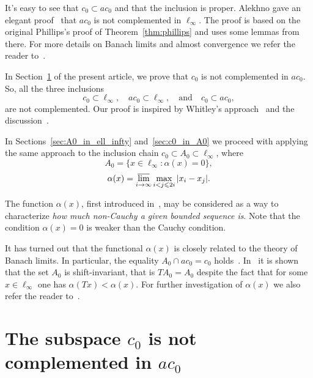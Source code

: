 \documentclass[a4paper,10pt]{article} %
\theoremstyle{plain}
\theoremstyle{definition}
\begin{document}
It's easy to see that $c_0 \subset ac_0$ and that the inclusion is proper.
Alekhno gave an elegant proof~\cite[Theorem 8]{alekhno2006propertiesII}
that $ac_0$ is not complemented in $\ell_\infty$.
The proof is based on the original Phillips's proof of Theorem~\ref{thm:phillips}
and uses some lemmas from there.
For more details on Banach limits and almost convergence we refer the reader to~\cite{sucheston1967banach,Eberlein,semenov2020geomBL}.

In Section~\ref{sec:c0_in_ac0} of the present article, we prove that $c_0$ is not complemented in $ac_0$.
So, all the three inclusions
\begin{equation}
	c_0 \subset \ell_\infty,
	\quad
	ac_0 \subset \ell_\infty,
	\quad\mbox{and}\quad
	c_0 \subset ac_0,
\end{equation}
are not complemented.
Our proof is inspired by Whitley's approach~\cite{whitley1968projecting}
and the discussion~\cite{mathSE_Phillips}.

In Sections~\ref{sec:A0_in_ell_infty} and~\ref{sec:c0_in_A0}
we proceed with applying the same approach to the inclusion chain $c_0 \subset A_0 \subset \ell_\infty$,
where
\begin{equation}
	A_0 = \{x\in\ell_\infty: \alpha(x) = 0\}
	,
\end{equation}
\begin{equation}
	\alpha(x) = \varlimsup_{i\to\infty} \max_{i<j\leqslant 2i} |x_i - x_j|
	.
\end{equation}

The function $\alpha(x)$, first introduced in~\cite{our-vzms-2018},
may be considered as a way to characterize \emph{how much non-Cauchy a given bounded sequence is}.
Note that the condition $\alpha(x) =0$ is weaker than the Cauchy condition.

It has turned out that the functional $\alpha(x)$ is closely related to the theory of Banach limits.
In particular, the equality $A_0\cap ac_0 = c_0$ holds~\cite{avdeev2019space}.
In~\cite{our-ped-2018-alpha-Tx} it is shown that the set $A_0$ is shift-invariant, that is
$TA_0 = A_0$ despite the fact that for some $x\in\ell_\infty$
one has $\alpha(Tx)<\alpha(x)$.
For further investigation of $\alpha(x)$ we also refer the reader to~\cite{avdeev2021subsets}.

\section{The subspace $c_0$ is not complemented in $ac_0$}
\label{sec:c0_in_ac0}
\end{document}
